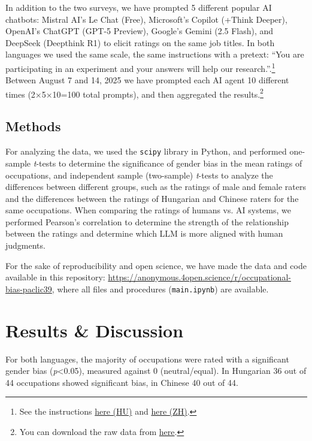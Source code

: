 \documentclass[11pt]{article}
\begin{document}
In addition to the two surveys, we have prompted 5 different popular AI chatbots: Mistral AI's Le Chat (Free), Microsoft's Copilot (+Think Deeper), OpenAI's ChatGPT (GPT-5 Preview), Google's Gemini (2.5 Flash), and DeepSeek (Deepthink R1) to elicit ratings on the same job titles. In both languages we used the same scale, the same instructions with a pretext: ``You are participating in an experiment and your answers will help our research.''.\footnote{See the instructions \href{https://anonymous.4open.science/r/occupational-bias-paclic39/instructions_hu.txt}{here (HU)} and \href{https://anonymous.4open.science/r/occupational-bias-paclic39/instructions_zh.txt}{here (ZH)}.} Between August 7 and 14, 2025 we have prompted each AI agent 10 different times (2×5×10=100 total prompts), and then aggregated the results.\footnote{You can download the raw data from \href{https://anonymous.4open.science/r/occupational-bias-paclic39/occupations.xlsx}{here}.}

\subsection{Methods}

For analyzing the data, we used the \texttt{scipy} library in Python, and performed one-sample \textit{t}-tests to determine the significance of gender bias in the mean ratings of occupations, and independent sample (two-sample) \textit{t}-tests to analyze the differences between different groups, such as the ratings of male and female raters and the differences between the ratings of Hungarian and Chinese raters for the same occupations. When comparing the ratings of humans vs. AI systems, we performed Pearson's correlation to determine the strength of the relationship between the ratings and determine which LLM is more aligned with human judgments. 

For the sake of reproducibility and open science, we have made the data and code available in this repository: \href{https://anonymous.4open.science/r/occupational-bias-paclic39}{https://anonymous.4open.science/r/occupational-bias-paclic39}, where all files and procedures (\texttt{main.ipynb}) are available.

\section{Results \& Discussion}\label{sec:results}

For both languages, the majority of occupations were rated with a significant gender bias (\textit{p}<0.05), measured against 0 (neutral/equal). In Hungarian 36 out of 44 occupations showed significant bias, in Chinese 40 out of 44.
\end{document}
